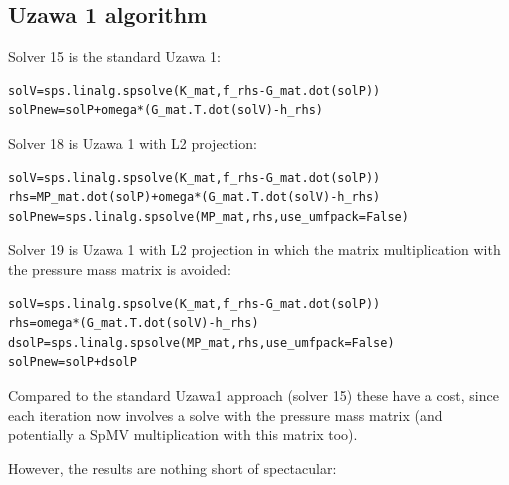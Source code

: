 \subsection*{Uzawa 1 algorithm}

Solver 15 is the standard Uzawa 1:
\begin{lstlisting}
solV=sps.linalg.spsolve(K_mat,f_rhs-G_mat.dot(solP))
solPnew=solP+omega*(G_mat.T.dot(solV)-h_rhs)         
\end{lstlisting}

Solver 18 is Uzawa 1 with L2 projection:
\begin{lstlisting}
solV=sps.linalg.spsolve(K_mat,f_rhs-G_mat.dot(solP))     
rhs=MP_mat.dot(solP)+omega*(G_mat.T.dot(solV)-h_rhs)      
solPnew=sps.linalg.spsolve(MP_mat,rhs,use_umfpack=False)   
\end{lstlisting}


Solver 19 is Uzawa 1 with L2 projection in which 
the matrix multiplication with the pressure mass matrix is avoided:
\begin{lstlisting}
solV=sps.linalg.spsolve(K_mat,f_rhs-G_mat.dot(solP))   
rhs=omega*(G_mat.T.dot(solV)-h_rhs)                     
dsolP=sps.linalg.spsolve(MP_mat,rhs,use_umfpack=False)   
solPnew=solP+dsolP                                    
\end{lstlisting}

Compared to the standard Uzawa1 approach (solver 15) these have a cost, 
since each iteration now involves a solve with the pressure mass matrix 
(and potentially a SpMV multiplication with this matrix too). 

However, the results are nothing short of spectacular:

